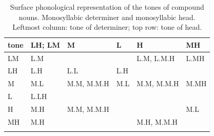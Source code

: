 \begin{subtables}
\label{tab:surfacecompounds}
\begin{table}[p]%
\caption{\label{tab:surfacemonosyllabicmonosyllables}Surface phonological representation of the tones of
  compound nouns. Monosyllabic determiner and monosyllabic head. Leftmost column: tone of determiner; top row: tone of head.}
{\renewcommand{\arraystretch}{1.2}
\begin{tabularx}{\textwidth}{ Q Q l Q P{21mm} Q }
\lsptoprule
	tone & LH; LM & M & L & H & MH\\ \midrule
	LM & L.M &  & \hspace*{\fill} & L.M, L.M.H & L.MH\\
	LH & L.H & L.L & L.H & \hspace*{\fill} &  \hspace*{\fill}\\
	M & M.L & M.M, M.M.H & M.L & M.M, M.M.H & M.MH\\
	L & L.LH &  &  &  &  \hspace*{\fill}\\
	H & M.H & M.M, M.M.H &  & \hspace*{\fill} & M.L\\
	MH & M.H &  &  \hspace*{\fill} & M.H, M.M.H & \hspace*{\fill}\\
\lspbottomrule
\end{tabularx}}
\end{table}



\end{subtables}
